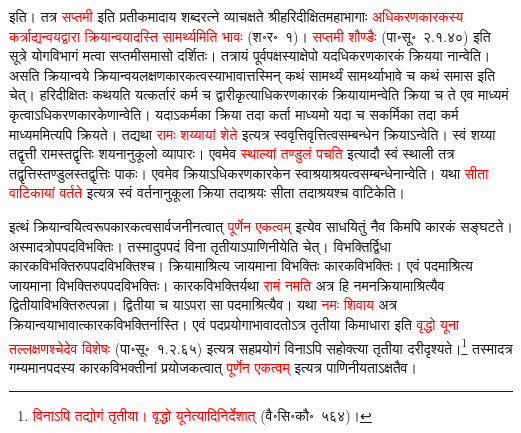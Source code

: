 \begin{sloppypar}\justifying\noindent इति। तत्र \textcolor{red}{सप्तमी} इति प्रतीकमादाय शब्दरत्ने व्याचक्षते श्रीहरिदीक्षित\-महाभागाः \textcolor{red}{अधिकरण\-कारकस्य कर्त्राद्यन्वय\-द्वारा क्रियान्वयादस्ति सामर्थ्यमिति भावः} (श॰र॰~१)। \textcolor{red}{सप्तमी शौण्डैः} (पा॰सू॰~२.१.४०) इति सूत्रे योग\-विभागं मत्वा सप्तमी\-समासो दर्शितः। तत्रायं पूर्वपक्षस्याक्षेपो यदधिकरण\-कारकं क्रियया नान्वेति। असति क्रियान्वये क्रियान्वय\-लक्षण\-कारकत्वस्याभावात्तस्मिन् कथं सामर्थ्यं सामर्थ्याभावे च कथं समास इति चेत्। हरिदीक्षितः कथयति यत्कर्तारं कर्म च द्वारीकृत्याधिकरण\-कारकं क्रियायामन्वेति क्रिया च ते एव माध्यमं कृत्वाऽधिकरण\-कारकेणान्वेति। यदाऽकर्मका क्रिया तदा कर्ता माध्यमो यदा च सकर्मिका तदा कर्म माध्यममित्यपि क्रियते। तद्यथा \textcolor{red}{रामः शय्यायां शेते} इत्यत्र स्व\-वृत्ति\-वृत्तित्व\-सम्बन्धेन क्रियाऽन्वेति। स्वं शय्या तद्वृत्ती रामस्तद्वृत्तिः शयनानुकूलो व्यापारः। एवमेव \textcolor{red}{स्थाल्यां तण्डुलं पचति} इत्यादौ स्वं स्थाली तत्र तद्वृत्तिस्तण्डुलस्तद्वृत्तिः पाकः। एवमेव क्रियाऽधिकरण\-कारकेन स्वाश्रयाश्रयत्व\-सम्बन्धेनान्वेति। यथा \textcolor{red}{सीता वाटिकायां वर्तते} इत्यत्र स्वं वर्तनानुकूला क्रिया तदाश्रयः सीता तदाश्रयश्च वाटिकेति।\end{sloppypar}
\begin{sloppypar}\justifying\noindent\hspace{10mm} इत्थं क्रियान्वयित्व\-रूप\-कारकत्व\-सार्वजनीनत्वात् \textcolor{red}{पूर्णेन एकत्वम्‌} इत्येव साधयितुं नैव किमपि कारकं सङ्घटते। अस्मादत्रोपपद\-विभक्तिः। तस्मादुपपदं विना तृतीयाऽपाणिनीयेति चेत्। विभक्तिर्द्विधा कारक\-विभक्तिरुपपद\-विभक्तिश्च। क्रियामाश्रित्य जायमाना विभक्तिः कारक\-विभक्तिः। एवं पदमाश्रित्य जायमाना विभक्तिरुपपद\-विभक्तिः। कारक\-विभक्तिर्यथा \textcolor{red}{रामं नमति} अत्र हि नमन\-क्रियामाश्रित्यैव द्वितीया\-विभक्तिरुत्पन्ना। द्वितीया च याऽपरा सा पदमाश्रित्यैव। यथा \textcolor{red}{नमः शिवाय} अत्र क्रियान्वयाभावात्कारक\-विभक्तिर्नास्ति। एवं पद\-प्रयोगाभावादतोऽत्र तृतीया किमाधारा इति \textcolor{red}{वृद्धो यूना तल्लक्षणश्चेदेव विशेषः} (पा॰सू॰~१.२.६५) इत्यत्र सह\-प्रयोगं विनाऽपि सहोक्त्या तृतीया दरीदृश्यते।\footnote{\textcolor{red}{विनाऽपि तद्योगं तृतीया। वृद्धो यूनेत्यादिनिर्देशात्‌} (वै॰सि॰कौ॰~५६४)।} तस्मादत्र गम्यमान\-पदस्य कारक\-विभक्तीनां प्रयोजकत्वात् \textcolor{red}{पूर्णेन एकत्वम्‌} इत्यत्र पाणिनीयताऽक्षतैव।\end{sloppypar}
